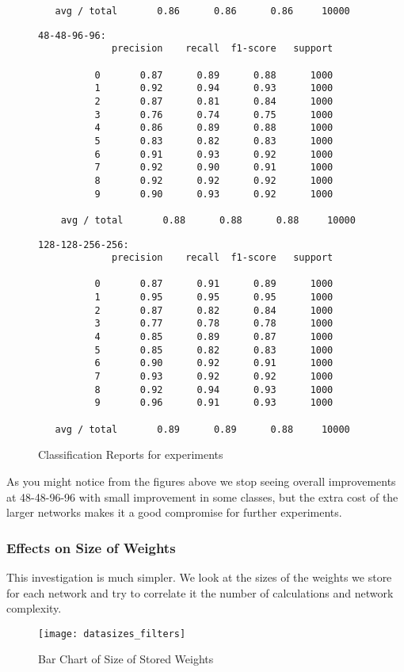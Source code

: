 \begin{figure}
\begin{verbatim}
   avg / total       0.86      0.86      0.86     10000
\end{verbatim}
\begin{verbatim}  
48-48-96-96:  
             precision    recall  f1-score   support
             
          0       0.87      0.89      0.88      1000
          1       0.92      0.94      0.93      1000
          2       0.87      0.81      0.84      1000
          3       0.76      0.74      0.75      1000
          4       0.86      0.89      0.88      1000
          5       0.83      0.82      0.83      1000
          6       0.91      0.93      0.92      1000
          7       0.92      0.90      0.91      1000
          8       0.92      0.92      0.92      1000
          9       0.90      0.93      0.92      1000
             
    avg / total       0.88      0.88      0.88     10000
\end{verbatim}
\begin{verbatim}  
128-128-256-256:
             precision    recall  f1-score   support
             
          0       0.87      0.91      0.89      1000
          1       0.95      0.95      0.95      1000
          2       0.87      0.82      0.84      1000
          3       0.77      0.78      0.78      1000
          4       0.85      0.89      0.87      1000
          5       0.85      0.82      0.83      1000
          6       0.90      0.92      0.91      1000
          7       0.93      0.92      0.92      1000
          8       0.92      0.94      0.93      1000
          9       0.96      0.91      0.93      1000
             
   avg / total       0.89      0.89      0.88     10000
\end{verbatim}
\caption{Classification Reports for experiments}
\end{figure}

As you might notice from the figures above we stop seeing overall improvements at 48-48-96-96 with small improvement in some classes, but the extra cost of the larger networks makes it a good compromise for further experiments.
\subsubsection{Effects on Size of Weights}
This investigation is much simpler. We look at the sizes of the weights we store for each network and try to correlate it the number of calculations and network complexity.
\begin{figure}
	\texttt{[image: datasizes\_filters]}
	\caption{Bar Chart of Size of Stored Weights}
\end{figure}

